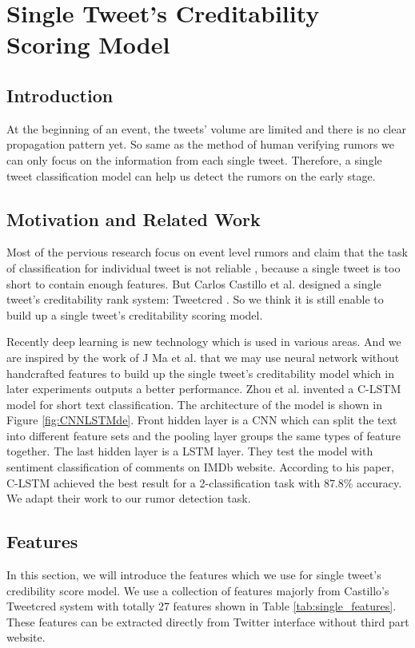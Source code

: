 
\chapter{Single Tweet's Creditability Scoring Model} %
\label{cha:single_tweet_creditbility_scoring_model}
\section{Introduction} %
At the beginning of an event, the tweets' volume are limited and there is no clear propagation pattern yet. So same as the method of human verifying rumors we can only focus on the information from each single tweet. Therefore, a single tweet classification model can help us detect the rumors on the early stage. 


\section{Motivation and Related Work} %

Most of the pervious research focus on event level rumors and claim that the task of classification for individual tweet is not reliable \cite{liu2015real} \cite{ma2015detect} \cite{zhao2015enquiring}, because a single tweet is too short to contain enough features. But Carlos Castillo et al. designed a single tweet's creditability rank system: Tweetcred \cite{gupta2014tweetcred}. So we think it is still enable to build up a single tweet's creditability scoring model. 

Recently deep learning is new technology which is used in various areas. And we are inspired by the work of J Ma et al. \cite{lai2015recurrent} that we may use neural network without handcrafted features to build up the single tweet's creditability model which in later experiments outputs a better performance.  
   Zhou et al. invented a C-LSTM model \cite{zhou2015c} for short text classification. The architecture of the model is shown in Figure \ref{fig:CNNLSTMde}. Front hidden layer is a CNN which can split the text into different feature sets and the pooling layer groups the same types of feature together. The last hidden layer is a LSTM layer. They test the model with sentiment classification of  comments on IMDb website. According to his paper, C-LSTM achieved the best result for a 2-classification task with 87.8\% accuracy. We adapt their work to our rumor detection task.

  

\section{Features}
\label{featuressingle}
In this section, we will introduce the features which we use for single tweet's credibility score model. We use a collection of features majorly from Castillo's Tweetcred system \cite{gupta2014tweetcred} with totally 27 features shown in Table \ref{tab:single_features}. These features can be extracted directly from Twitter interface without third part website. 

